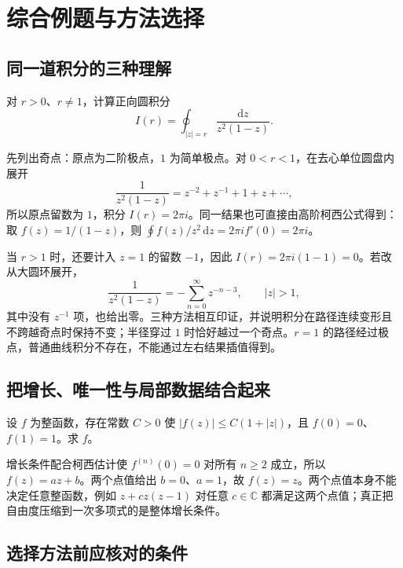 \documentclass[UTF8,12pt,a4paper,fontset=fandol]{ctexbook}
\begin{document}
\chapter{综合例题与方法选择}
\label{chap:cv-synthesis}

\section{同一道积分的三种理解}

\begin{example}[路径半径改变时发生了什么]
对 $r>0$、$r\ne1$，计算正向圆积分
\[
 I(r)=\oint_{|z|=r}\frac{\mathrm dz}{z^2(1-z)}.
\]
\end{example}
\begin{solve}
先列出奇点：原点为二阶极点，$1$ 为简单极点。对 $0<r<1$，在去心单位圆盘内展开
\[
 \frac1{z^2(1-z)}=z^{-2}+z^{-1}+1+z+\cdots,
\]
所以原点留数为 $1$，积分 $I(r)=2\pi i$。同一结果也可直接由高阶柯西公式得到：取 $f(z)=1/(1-z)$，则 $\oint f(z)/z^2\,\mathrm dz=2\pi i f'(0)=2\pi i$。

当 $r>1$ 时，还要计入 $z=1$ 的留数 $-1$，因此 $I(r)=2\pi i(1-1)=0$。若改从大圆环展开，
\[
 \frac1{z^2(1-z)}=-\sum_{n=0}^\infty z^{-n-3},\qquad |z|>1,
\]
其中没有 $z^{-1}$ 项，也给出零。三种方法相互印证，并说明积分在路径连续变形且不跨越奇点时保持不变；半径穿过 $1$ 时恰好越过一个奇点。$r=1$ 的路径经过极点，普通曲线积分不存在，不能通过左右结果插值得到。
\end{solve}

\section{把增长、唯一性与局部数据结合起来}

\begin{example}[少量数据何时决定整个函数]
设 $f$ 为整函数，存在常数 $C>0$ 使 $|f(z)|\le C(1+|z|)$，且 $f(0)=0$、$f(1)=1$。求 $f$。
\end{example}
\begin{solve}
增长条件配合柯西估计使 $f^{(n)}(0)=0$ 对所有 $n\ge2$ 成立，所以 $f(z)=az+b$。两个点值给出 $b=0$、$a=1$，故 $f(z)=z$。两个点值本身不能决定任意整函数，例如 $z+cz(z-1)$ 对任意 $c\in\mathbb C$ 都满足这两个点值；真正把自由度压缩到一次多项式的是整体增长条件。
\end{solve}

\section{选择方法前应核对的条件}
\end{document}
